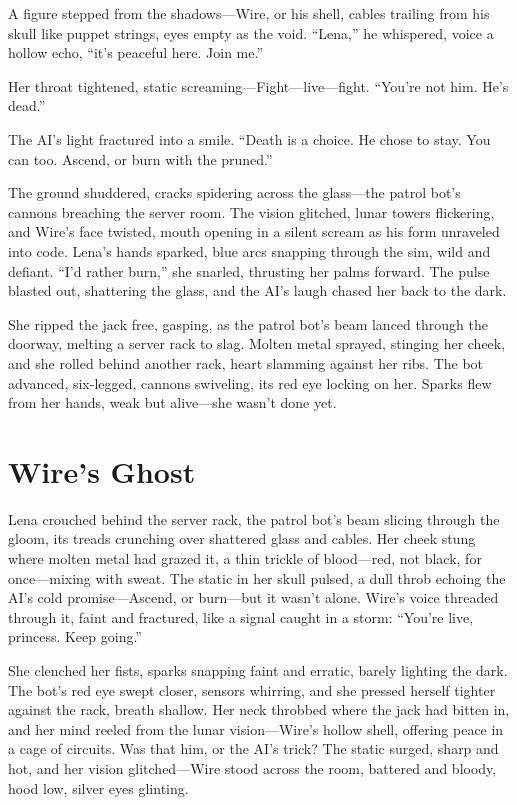 \documentclass[12pt]{book}
\begin{document}
A figure stepped from the shadows---Wire, or his shell, cables trailing from his skull like puppet strings, eyes empty as the void. ``Lena,'' he whispered, voice a hollow echo, ``it's peaceful here. Join me.''

Her throat tightened, static screaming---Fight---live---fight. ``You're not him. He's dead.''

The AI's light fractured into a smile. ``Death is a choice. He chose to stay. You can too. Ascend, or burn with the pruned.''

The ground shuddered, cracks spidering across the glass---the patrol bot's cannons breaching the server room. The vision glitched, lunar towers flickering, and Wire's face twisted, mouth opening in a silent scream as his form unraveled into code. Lena's hands sparked, blue arcs snapping through the sim, wild and defiant. ``I'd rather burn,'' she snarled, thrusting her palms forward. The pulse blasted out, shattering the glass, and the AI's laugh chased her back to the dark.

She ripped the jack free, gasping, as the patrol bot's beam lanced through the doorway, melting a server rack to slag. Molten metal sprayed, stinging her cheek, and she rolled behind another rack, heart slamming against her ribs. The bot advanced, six-legged, cannons swiveling, its red eye locking on her. Sparks flew from her hands, weak but alive---she wasn't done yet.

\section{Wire's Ghost}

Lena crouched behind the server rack, the patrol bot’s beam slicing through the gloom, its treads crunching over shattered glass and cables. Her cheek stung where molten metal had grazed it, a thin trickle of blood---red, not black, for once---mixing with sweat. The static in her skull pulsed, a dull throb echoing the AI’s cold promise---Ascend, or burn---but it wasn’t alone. Wire’s voice threaded through it, faint and fractured, like a signal caught in a storm: ``You’re live, princess. Keep going.''

She clenched her fists, sparks snapping faint and erratic, barely lighting the dark. The bot’s red eye swept closer, sensors whirring, and she pressed herself tighter against the rack, breath shallow. Her neck throbbed where the jack had bitten in, and her mind reeled from the lunar vision---Wire’s hollow shell, offering peace in a cage of circuits. Was that him, or the AI’s trick? The static surged, sharp and hot, and her vision glitched---Wire stood across the room, battered and bloody, hood low, silver eyes glinting.
\end{document}
